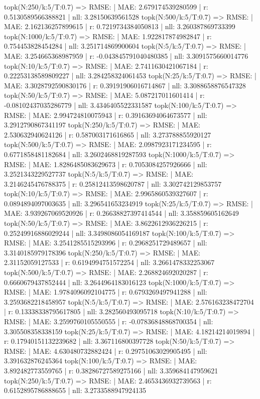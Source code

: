 topk(N:250/k:5/T:0.7) => RMSE: | MAE: 2.679174539280599 | r: 0.5130589566388821 | nll: 3.28150639561528
topk(N:500/k:5/T:0.7) => RMSE: | MAE: 2.162136257899615 | r: 0.7219734384050813 | nll: 3.260387869733399
topk(N:1000/k:5/T:0.7) => RMSE: | MAE: 1.922817874982847 | r: 0.754453828454284 | nll: 3.251714869900604
topk(N:5/k:5/T:0.7) => RMSE: | MAE: 3.254665368987959 | r: -0.043845791040480385 | nll: 3.3091575660014776
topk(N:10/k:5/T:0.7) => RMSE: | MAE: 2.7411630421067184 | r: 0.22253138589809227 | nll: 3.284258324061453
topk(N:25/k:5/T:0.7) => RMSE: | MAE: 3.3028792590830176 | r: 0.39191906016714867 | nll: 3.3088658876547328
topk(N:50/k:5/T:0.7) => RMSE: | MAE: 5.087217011601414 | r: -0.08102437035286779 | nll: 3.4346405522331587
topk(N:100/k:5/T:0.7) => RMSE: | MAE: 2.994724810075943 | r: 0.39163694064673577 | nll: 3.2912790867341197
topk(N:250/k:5/T:0.7) => RMSE: | MAE: 2.530632940624126 | r: 0.587003171616865 | nll: 3.273788855920127
topk(N:500/k:5/T:0.7) => RMSE: | MAE: 2.0987923171234595 | r: 0.6771858481182684 | nll: 3.2602468819287593
topk(N:1000/k:5/T:0.7) => RMSE: | MAE: 1.8286485083629673 | r: 0.7053084257926666 | nll: 3.2521343229527737
topk(N:5/k:5/T:0.7) => RMSE: | MAE: 3.2146245476788375 | r: 0.25812413598620787 | nll: 3.302742129853757
topk(N:10/k:5/T:0.7) => RMSE: | MAE: 2.9965860539327607 | r: 0.0894894097003635 | nll: 3.296541653234919
topk(N:25/k:5/T:0.7) => RMSE: | MAE: 3.939267069520926 | r: 0.26638827397414544 | nll: 3.358859605162649
topk(N:50/k:5/T:0.7) => RMSE: | MAE: 3.8622612936226215 | r: 0.25249916886029244 | nll: 3.3498086054169187
topk(N:100/k:5/T:0.7) => RMSE: | MAE: 3.2541285515293996 | r: 0.2968251729489657 | nll: 3.3140185979178396
topk(N:250/k:5/T:0.7) => RMSE: | MAE: 2.31152059127533 | r: 0.6194994751572254 | nll: 3.2661478332253067
topk(N:500/k:5/T:0.7) => RMSE: | MAE: 2.268824692020287 | r: 0.6660679437852444 | nll: 3.2644964183016123
topk(N:1000/k:5/T:0.7) => RMSE: | MAE: 1.9784096092104775 | r: 0.6793269497941288 | nll: 3.2593682218458957
topk(N:5/k:5/T:0.7) => RMSE: | MAE: 2.576163238472704 | r: 0.13338338795617805 | nll: 3.282560493095718
topk(N:10/k:5/T:0.7) => RMSE: | MAE: 3.2599760105550555 | r: -0.07836848868700354 | nll: 3.305508358338159
topk(N:25/k:5/T:0.7) => RMSE: | MAE: 4.18214214019894 | r: 0.17940151132239682 | nll: 3.367116800397728
topk(N:50/k:5/T:0.7) => RMSE: | MAE: 4.630480732882424 | r: 0.29751063029905495 | nll: 3.391632876245364
topk(N:100/k:5/T:0.7) => RMSE: | MAE: 3.892482773559765 | r: 0.38286727589275166 | nll: 3.359684147959621
topk(N:250/k:5/T:0.7) => RMSE: | MAE: 2.4653436932739563 | r: 0.6152895786888655 | nll: 3.2733588947924135
